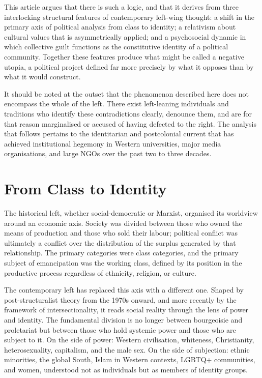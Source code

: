 	This article argues that there is such a logic, and that it derives from three
	interlocking structural features of contemporary left-wing thought: a shift in the
	primary axis of political analysis from class to identity; a relativism about
	cultural values that is asymmetrically applied; and a psychosocial dynamic in which
	collective guilt functions as the constitutive identity of a political community.
	Together these features produce what might be called a negative utopia, a political
	project defined far more precisely by what it opposes than by what it would
	construct.
	
	It should be noted at the outset that the phenomenon described here does not
	encompass the whole of the left. There exist left-leaning individuals and traditions
	who identify these contradictions clearly, denounce them, and are for that reason
	marginalised or accused of having defected to the right. The analysis that follows
	pertains to the identitarian and postcolonial current that has achieved institutional
	hegemony in Western universities, major media organisations, and large NGOs over the
	past two to three decades.
	
	\section{From Class to Identity}
	
	The historical left, whether social-democratic or Marxist, organised its worldview
	around an economic axis. Society was divided between those who owned the means of
	production and those who sold their labour; political conflict was ultimately a
	conflict over the distribution of the surplus generated by that relationship. The
	primary categories were class categories, and the primary subject of emancipation
	was the working class, defined by its position in the productive process regardless
	of ethnicity, religion, or culture.
	
	The contemporary left has replaced this axis with a different one. Shaped by
	post-structuralist theory from the 1970s onward, and more recently by the framework
	of intersectionality, it reads social reality through the lens of power and
	identity. The fundamental division is no longer between bourgeoisie and proletariat
	but between those who hold systemic power and those who are subject to it. On the
	side of power: Western civilisation, whiteness, Christianity, heterosexuality,
	capitalism, and the male sex. On the side of subjection: ethnic minorities, the
	global South, Islam in Western contexts, LGBTQ+ communities, and women, understood
	not as individuals but as members of identity groups.
	
